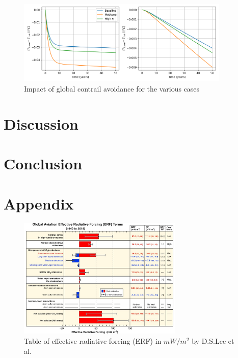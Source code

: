 \documentclass{article}
\begin{document}
\begin{figure}[H]
    \centering
    \includegraphics[width=0.9\textwidth]{figures/avoidance_comparison.png}
    \caption{Impact of global contrail avoidance for the various cases}
\end{figure}


\section{Discussion}

\section{Conclusion}

\section{Appendix}

\begin{figure}[H]
    \centering
    \includegraphics[width=0.7\textwidth]{figures/DSLee_ERFtable.jpg}
    \caption{Table of effective radiative forcing (ERF) in $mW/m^2$ by D.S.Lee et al. \cite{contrail_radiative_forcing}}
    \label{fig:rf_table}
\end{figure}
\end{document}
